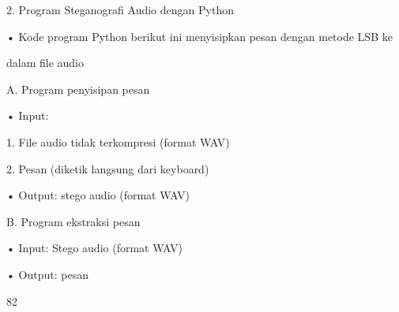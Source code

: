\documentclass{article}
\begin{document}

2. Program Steganografi Audio dengan Python

• Kode program Python berikut ini menyisipkan pesan dengan metode LSB ke 

dalam file audio 

A. Program penyisipan pesan 

• Input: 

   1.  File audio tidak terkompresi (format WAV)

   2.  Pesan (diketik langsung dari keyboard)

• Output: stego audio (format WAV)

B. Program ekstraksi pesan

• Input:  Stego audio (format WAV)

• Output: pesan 

82
\end{document}
